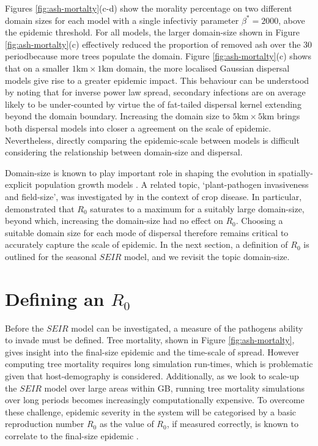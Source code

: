 Figures \ref{fig:ash-mortalty}(c-d) show the morality percentage on two different domain sizes for each model with a single infectiviy parameter $\beta^*=2000$, above the epidemic threshold.
For all models, the larger domain-size shown in Figure \ref{fig:ash-mortalty}(c) effectively reduced the proportion of removed ash over the $30$ period\textemdash because more trees populate the domain. 
Figure \ref{fig:ash-mortalty}(c) shows that on a smaller $1\mathrm{km}\times 1\mathrm{km}$ domain, the more localised Gaussian dispersal models give rise to a greater epidemic impact.
This behaviour can be understood by noting that for inverse power law spread, secondary infections are on average likely to be under-counted
by virtue the of fat-tailed dispersal kernel extending beyond the domain boundary.
Increasing the domain size to $5\mathrm{km}\times 5\mathrm{km}$ brings both dispersal models into closer a agreement on the scale of epidemic.
Nevertheless, directly comparing the epidemic-scale between models is difficult considering the relationship between domain-size and dispersal.

Domain-size is known to play important role in shaping the evolution in spatially-explicit population growth models \cite{tang2011asymptotic}.
A related topic, `plant-pathogen invasiveness and field-size', was investigated by \cite{mikaberidze2016invasiveness} in the context of crop disease.
In particular, \cite{mikaberidze2016invasiveness} demonstrated that $R_0$ saturates to a maximum for a suitably large domain-size, beyond which, increasing the domain-size had no effect on $R_0$.
Choosing a suitable domain size for each mode of dispersal therefore remains critical to accurately capture the scale of epidemic.
In the next section, a definition of $R_0$ is outlined for the seasonal $SEIR$ model, and we revisit the topic domain-size.

\section{Defining an $R_0$}


Before the $SEIR$ model can be investigated, a measure of the pathogens ability to invade must be defined.
Tree mortality, shown in Figure \ref{fig:ash-mortalty}, gives insight into the final-size epidemic and the time-scale of spread.
However computing tree mortality requires long simulation run-times, which is problematic given that host-demography is considered.
Additionally, as we look to scale-up the $SEIR$ model over large areas within GB, running tree mortality simulations over long periods becomes increasingly computationally expensive.
To overcome these challenge, epidemic severity in the system will be categorised by a basic reproduction number $R_0$\textemdash
as the value of $R_0$, if measured correctly, is known to correlate to the final-size epidemic \cite{R0-perc-ref}.

